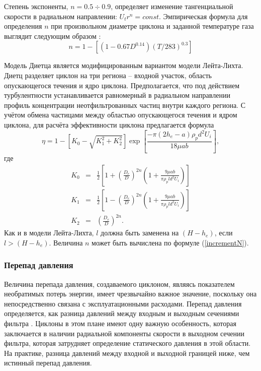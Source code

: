 			Степень экспоненты, $n = 0.5 \div 0.9$, определяет изменение тангенциальной скорости в радиальном направлении: $U_tr^n = const$. Эмпирическая формула для определения $n$ при произвольном диаметре циклона и заданной температуре газа выглядит следующим образом \cite{Alexander}:
			\begin{equation}
				\label{incrementN}
				n = 1 - \left[ (1-0.67D^{0.14})(T/283)^{0.3} \right]
			\end{equation}
			
			Модель Диетца \cite{Dietz} является модифицированным вариантом модели Лейта-Лихта. Диетц разделяет циклон на три региона -- входной участок, область опускающегося течения и ядро циклона. Предполагается, что под действием турбулентности устанавливается равномерный в радиальном направлении профиль концентрации неотфильтрованных частиц внутри каждого региона. С учётом обмена частицами между областью опускающегося течения и ядром циклона, для расчёта эффективности циклона предлагается формула
			\begin{equation}
				\eta = 1 - \left[ K_0 - \sqrt{K_1^2 + K_2^2} \right]\exp{\left[\frac{-\pi (2h_e - a)\rho_p d^2 U_i}{18 \mu ab}\right]},
			\end{equation}
			где 
			\begin{eqnarray}
				K_0 &=& \frac{1}{2}\left[ 1 + \left(\frac{D_e}{D}\right)^{2n}\left(1+\frac{9\mu ab}{ \pi \rho_p l d^2 U_i}\right) \right] \\
				K_1 &=& \frac{1}{2}\left[ 1 - \left(\frac{D_e}{D}\right)^{2n}\left(1+\frac{9\mu ab}{ \pi \rho_p l d^2 U_i}\right) \right] \\
				K_2 &=& \left(\frac{D_e}{D}\right)^{2n}.
			\end{eqnarray}
			Как и в модели Лейта-Лихта, $l$ должна быть заменена на $(H-h_e)$, если $l>(H-h_e)$. Величина $n$ может быть вычислена по формуле (\ref{incrementN}).
	\subsubsection*{Перепад давления}
		Величина перепада давления, создаваемого циклоном, являясь показателем необратимых потерь энергии, имеет чрезвычайно важное значение, поскольку она непосредственно связана с эксплуатационными расходами. Перепад давления определяется, как разница давлений между входным и выходным сечениями фильтра \cite{Utikar}. Циклоны в этом плане имеют одну важную особенность, которая заключается в наличии радиальной компоненты скорости в выходном сечении фильтра, которая затрудняет определение статического давления в этой области. На практике, разница давлений между входной и выходной границей ниже, чем истинный перепад давления.
		
